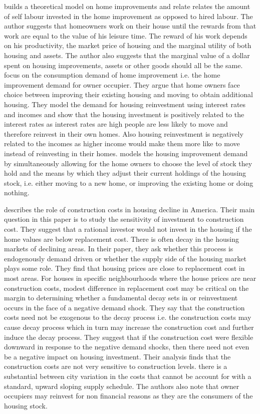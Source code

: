 \documentclass{article}
\begin{document}
\citet{mendelsohn1977empirical} builds a theoretical model on home improvements and relate relates the amount of self labour invested in the home improvement as opposed to hired labour. The author suggests that homeowners work on their house until the rewards from that work are equal to the value of his leisure time. The reward of his work depends on his productivity, the market price of housing and the marginal utility of both housing and assets. The author also suggests that the marginal value of a dollar spent on housing improvements, assets or other goods should all be the same. \citet{potepan1989interest} focus on the consumption demand of home improvement i.e. the home improvement demand for owner occupier. They argue that home owners face choice between improving their existing housing and moving to obtain additional housing. They model the demand for housing reinvestment using interest rates and incomes and show that the housing investment is positively related to the interest rates as interest rates are high people are less likely to move and therefore reinvest in their own homes. Also housing reinvestment is negatively related to the incomes as higher income would make them more like to move instead of reinvesting in their homes. \citet{montgomery1992explaining} models the housing improvement demand by simultaneously allowing for the home owners to choose the level of stock they hold and the means by which they adjust their current holdings of the housing stock, i.e. either moving to a new home, or improving the existing home or doing nothing. 

\citet{gyourko2003urban} describes the role of construction costs in housing decline in America. Their main question in this paper is to study the sensitivity of investment to construction cost. They suggest that a rational investor would not invest in the housing if the home values are below replacement cost. There is often decay in the housing markets of declining areas. In their paper, they ask whether this process is endogenously demand driven or whether the supply side of the housing market plays some role. They find that housing prices are close to replacement cost in most areas. For houses in specific neighbourhoods where the house prices are near construction costs, modest difference in replacement cost may be critical on the margin to determining whether a fundamental decay sets in or reinvestment occurs in the face of a negative demand shock. They say that the construction costs need not be exogenous to the decay process i.e. the construction costs may cause decay process which in turn may increase the construction cost and further induce the decay process. They suggest that if the construction cost were flexible downward in response to the negative demand shocks, then there need not even be a negative impact on housing investment. Their analysis finds that the construction costs are not very sensitive to construction levels. there is a substantial between city variation in the costs that cannot be account for with a standard, upward sloping supply schedule. The authors also note that owner occupiers may reinvest for non financial reasons as they are the consumers of the housing stock. 
\end{document}
